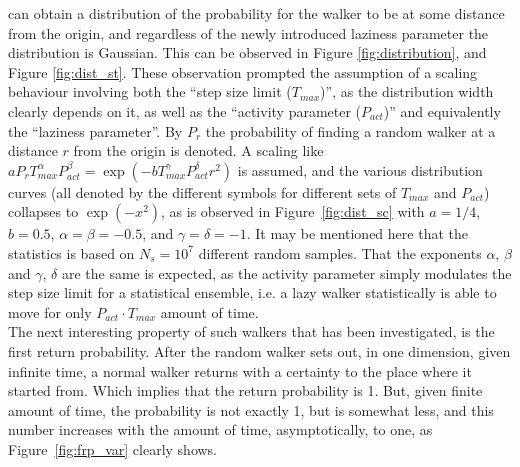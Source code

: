 \documentclass[12pt]{article}
\begin{document}
\begin{enumerate}[I.]
can obtain a distribution of the probability for the walker to be at some distance from the origin, and regardless of the newly introduced laziness parameter the distribution is Gaussian. This can be observed in Figure \ref{fig:distribution}, and Figure \ref{fig:dist_st}. These observation prompted the assumption of a scaling behaviour involving both the ``step size limit ($T_{max}$)'', as the distribution width clearly depends on it, as well as the ``activity parameter ($P_{act}$)'' and equivalently the ``laziness parameter''. By $P_r$ the probability of finding a random walker at a distance $r$ from the origin is denoted. A scaling like $aP_r T_{max}^\alpha P_{act}^\beta = \exp(-bT_{max}^\gamma P_{act}^\delta r^2)$ is assumed, and the various distribution curves (all denoted by the different symbols for different sets of $T_{max}$ and $P_{act}$) collapses to $\exp(-x^2)$, as is observed in Figure~\ref{fig:dist_sc} with $a=1/4$, $b=0.5$, $\alpha=\beta=-0.5$, and $\gamma=\delta=-1$. It may be mentioned here that the statistics is based on $N_s=10^7$ different random samples. That the exponents $\alpha$, $\beta$ and $\gamma$, $\delta$ are the same is expected, as the activity parameter simply modulates the step size limit for a statistical ensemble, i.e. a lazy walker statistically is able to move for only $P_{act}\cdot T_{max}$ amount of time.  \\ \newline The next interesting property of such walkers that has been investigated, is the first return probability. After the random walker sets out, in one dimension, given infinite time, a normal walker returns with a certainty to the place where it started from. Which implies that the return probability is 1. But, given finite amount of time, the probability is not exactly 1, but is somewhat less, and this number increases with the amount of time, asymptotically, to one, as Figure~\ref{fig:frp_var} clearly shows. %
\end{enumerate}
\end{document}
